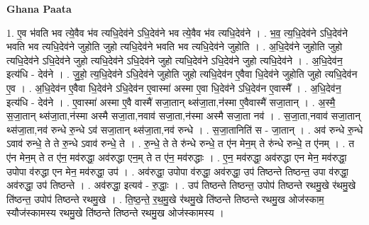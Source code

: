 \documentclass[17pt]{extarticle}
\begin{document}
\textbf{Ghana Paata } \newline

1. ए॒व भ॑वति भव त्ये॒वैव भ॑व त्यधि॒देव॑ने ऽधि॒देव॑ने भव त्ये॒वैव भ॑व त्यधि॒देव॑ने । . भ॒व॒ त्य॒धि॒देव॑ने ऽधि॒देव॑ने भवति भव त्यधि॒देव॑ने जुहोति जुहो त्यधि॒देव॑ने भवति भव त्यधि॒देव॑ने जुहोति । . अ॒धि॒देव॑ने जुहोति जुहो त्यधि॒देव॑ने ऽधि॒देव॑ने जुहो त्यधि॒देव॑ने ऽधि॒देव॑ने जुहो त्यधि॒देव॑ने ऽधि॒देव॑ने जुहो त्यधि॒देव॑ने । . अ॒धि॒देव॑न॒ इत्य॑धि - देव॑ने । . जु॒हो॒ त्य॒धि॒देव॑ने ऽधि॒देव॑ने जुहोति जुहो त्यधि॒देव॑न ए॒वैवा धि॒देव॑ने जुहोति जुहो त्यधि॒देव॑न ए॒व । . अ॒धि॒देव॑न ए॒वैवा धि॒देव॑ने ऽधि॒देव॑न ए॒वास्मा॑ अस्मा ए॒वा धि॒देव॑ने ऽधि॒देव॑न ए॒वास्मै᳚ । . अ॒धि॒देव॑न॒ इत्य॑धि - देव॑ने । . ए॒वास्मा॑ अस्मा ए॒वै वास्मै॑ सजा॒तान् थ्स॑जा॒ता,न॑स्मा ए॒वैवास्मै॑ सजा॒तान् । . अ॒स्मै॒ स॒जा॒तान् थ्स॑जा॒ता,न॑स्मा अस्मै सजा॒ता,नवाव॑ सजा॒ता,न॑स्मा अस्मै सजा॒ता नव॑ । . स॒जा॒ता,नवाव॑ सजा॒तान् थ्स॑जा॒ता,नव॑ रुन्धे रु॒न्धे ऽव॑ सजा॒तान् थ्स॑जा॒ता,नव॑ रुन्धे । . स॒जा॒तानिति॑ स - जा॒तान् । . अव॑ रुन्धे रु॒न्धे ऽवाव॑ रुन्धे॒ ते ते रु॒न्धे ऽवाव॑ रुन्धे॒ ते । . रु॒न्धे॒ ते ते रु॑न्धे रुन्धे॒ त ए॑न मेन॒म् ते रु॑न्धे रुन्धे॒ त ए॑नम् । . त ए॑न मेन॒म् ते त ए॑न॒ मव॑रुद्धा॒ अव॑रुद्धा एन॒म् ते त ए॑न॒ मव॑रुद्धाः । . ए॒न॒ मव॑रुद्धा॒ अव॑रुद्धा एन मेन॒ मव॑रुद्धा॒ उपोपा व॑रुद्धा एन मेन॒ मव॑रुद्धा॒ उप॑ । . अव॑रुद्धा॒ उपोपा व॑रुद्धा॒ अव॑रुद्धा॒ उप॑ तिष्ठन्ते तिष्ठन्त॒ उपा व॑रुद्धा॒ अव॑रुद्धा॒ उप॑ तिष्ठन्ते । . अव॑रुद्धा॒ इत्यव॑ - रु॒द्धाः॒ । . उप॑ तिष्ठन्ते तिष्ठन्त॒ उपोप॑ तिष्ठन्ते रथमु॒खे र॑थमु॒खे ति॑ष्ठन्त॒ उपोप॑ तिष्ठन्ते रथमु॒खे । . ति॒ष्ठ॒न्ते॒ र॒थ॒मु॒खे र॑थमु॒खे ति॑ष्ठन्ते तिष्ठन्ते रथमु॒ख ओज॑स्काम॒ स्यौज॑स्कामस्य रथमु॒खे ति॑ष्ठन्ते तिष्ठन्ते रथमु॒ख ओज॑स्कामस्य । \newline
\end{document}

